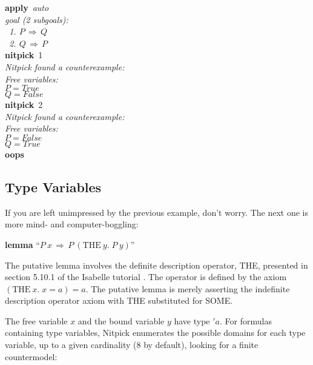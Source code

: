 \documentclass[a4paper,12pt]{article}
\begin{document}
\prew
\textbf{apply}~\textit{auto} \\[2\smallskipamount]
{\slshape goal (2 subgoals): \\
\ 1. $P\,\Longrightarrow\, Q$ \\
\ 2. $Q\,\Longrightarrow\, P$} \\[2\smallskipamount]
\textbf{nitpick}~1 \\[2\smallskipamount]
{\slshape Nitpick found a counterexample: \\[2\smallskipamount]
\hbox{}\qquad Free variables: \nopagebreak \\
\hbox{}\qquad\qquad $P = \textit{True}$ \\
\hbox{}\qquad\qquad $Q = \textit{False}$} \\[2\smallskipamount]
\textbf{nitpick}~2 \\[2\smallskipamount]
{\slshape Nitpick found a counterexample: \\[2\smallskipamount]
\hbox{}\qquad Free variables: \nopagebreak \\
\hbox{}\qquad\qquad $P = \textit{False}$ \\
\hbox{}\qquad\qquad $Q = \textit{True}$} \\[2\smallskipamount]
\textbf{oops}
\postw

\subsection{Type Variables}
\label{type-variables}

If you are left unimpressed by the previous example, don't worry. The next
one is more mind- and computer-boggling:

\prew
\textbf{lemma} ``$P~x\,\Longrightarrow\, P~(\textrm{THE}~y.\;P~y)$''
\postw
\pagebreak[2] %

The putative lemma involves the definite description operator, {THE}, presented
in section 5.10.1 of the Isabelle tutorial \cite{isa-tutorial}. The
operator is defined by the axiom $(\textrm{THE}~x.\; x = a) = a$. The putative
lemma is merely asserting the indefinite description operator axiom with {THE}
substituted for {SOME}.

The free variable $x$ and the bound variable $y$ have type $'a$. For formulas
containing type variables, Nitpick enumerates the possible domains for each type
variable, up to a given cardinality (8 by default), looking for a finite
countermodel:
\end{document}
